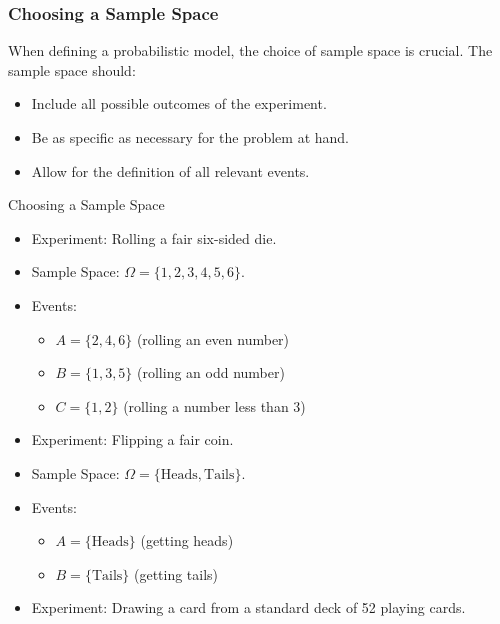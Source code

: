 \subsubsection{Choosing a Sample Space}
When defining a probabilistic model, the choice of sample space is crucial. The sample space should:
\begin{itemize}
    \item Include all possible outcomes of the experiment.
    \item Be as specific as necessary for the problem at hand.
    \item Allow for the definition of all relevant events.
\end{itemize}

\begin{exampleboxbreak}{Choosing a Sample Space}
\begin{itemize}
    \item Experiment: Rolling a fair six-sided die.
    \item Sample Space: \( \Omega = \{1, 2, 3, 4, 5, 6\} \).
    \item Events:
    \begin{itemize}
        \item \( A = \{2, 4, 6\} \) (rolling an even number)
        \item \( B = \{1, 3, 5\} \) (rolling an odd number)
        \item \( C = \{1, 2\} \) (rolling a number less than 3)
    \end{itemize}
\end{itemize}   
\begin{itemize}
    \item Experiment: Flipping a fair coin.
    \item Sample Space: \( \Omega = \{\text{Heads}, \text{Tails}\} \).
    \item Events:
    \begin{itemize}
        \item \( A = \{\text{Heads}\} \) (getting heads)
        \item \( B = \{\text{Tails}\} \) (getting tails)
    \end{itemize}
\end{itemize}
\begin{itemize} 
    \item Experiment: Drawing a card from a standard deck of 52 playing cards.

\end{itemize}
\end{exampleboxbreak}
